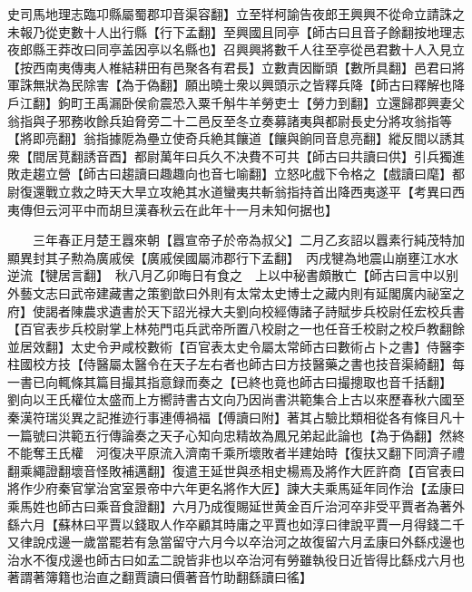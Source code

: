 史司馬地理志臨卭縣屬蜀郡卭音渠容翻】立至䍧柯諭告夜郎王興興不從命立請誅之未報乃從吏數十人出行縣【行下孟翻】至興國且同亭【師古曰且音子餘翻按地理志夜郎縣王莽改曰同亭盖因亭以名縣也】召興興將數千人往至亭從邑君數十人入見立【按西南夷傳夷人椎結耕田有邑聚各有君長】立數責因斷頭【數所具翻】邑君曰將軍誅無狀為民除害【為于偽翻】願出曉士衆以興頭示之皆釋兵降【師古曰釋解也降戶江翻】鉤町王禹漏卧侯俞震恐入粟千斛牛羊勞吏士【勞力到翻】立還歸郡興妻父翁指與子邪務收餘兵廹脅旁二十二邑反至冬立奏募諸夷與都尉長史分將攻翁指等【將即亮翻】翁指據阸為壘立使奇兵絶其饟道【饟與餉同音息亮翻】縱反間以誘其衆【間居莧翻誘音酉】都尉萬年曰兵久不决費不可共【師古曰共讀曰供】引兵獨進敗走趨立營【師古曰趨讀曰趣趣向也音七喻翻】立怒叱戲下令格之【戲讀曰麾】都尉復還戰立救之時天大旱立攻絶其水道蠻夷共斬翁指持首出降西夷遂平【考異曰西夷傳但云河平中而胡旦漢春秋云在此年十一月未知何据也】

　　三年春正月楚王囂來朝【囂宣帝子於帝為叔父】二月乙亥詔以囂素行純茂特加顯異封其子勲為廣戚侯【廣戚侯國屬沛郡行下孟翻】　丙戌犍為地震山崩壅江水水逆流【犍居言翻】　秋八月乙卯晦日有食之　上以中秘書頗散亡【師古曰言中以别外藝文志曰武帝建藏書之策劉歆曰外則有太常太史博士之藏内則有延閣廣内祕室之府】使謁者陳農求遺書於天下詔光禄大夫劉向校經傳諸子詩賦步兵校尉任宏校兵書【百官表步兵校尉掌上林苑門屯兵武帝所置八校尉之一也任音壬校尉之校戶教翻餘並居效翻】太史令尹咸校數術【百官表太史令屬太常師古曰數術占卜之書】侍醫李柱國校方技【侍醫屬太醫令在天子左右者也師古曰方技醫藥之書也技音渠綺翻】每一書已向輒條其篇目撮其指意録而奏之【已終也竟也師古曰撮摠取也音千括翻】　劉向以王氏權位太盛而上方嚮詩書古文向乃因尚書洪範集合上古以來歷春秋六國至秦漢符瑞災異之記推迹行事連傅禍福【傅讀曰附】著其占驗比類相從各有條目凡十一篇號曰洪範五行傳論奏之天子心知向忠精故為鳳兄弟起此論也【為于偽翻】然終不能奪王氏權　河復决平原流入濟南千乘所壞敗者半建始時【復扶又翻下同濟子禮翻乘繩證翻壞音怪敗補邁翻】復遣王延世與丞相史楊焉及將作大匠許商【百官表曰將作少府秦官掌治宮室景帝中六年更名將作大匠】諫大夫乘馬延年同作治【孟康曰乘馬姓也師古曰乘音食證翻】六月乃成復賜延世黄金百斤治河卒非受平賈者為著外繇六月【蘇林曰平賈以錢取人作卒顧其時庸之平賈也如淳曰律說平賈一月得錢二千又律說戍邊一歲當罷若有急當留守六月今以卒治河之故復留六月孟康曰外繇戍邊也治水不復戍邊也師古曰如孟二說皆非也以卒治河有勞雖執役日近皆得比繇戍六月也著謂著簿籍也治直之翻賈讀曰價著音竹助翻繇讀曰徭】

